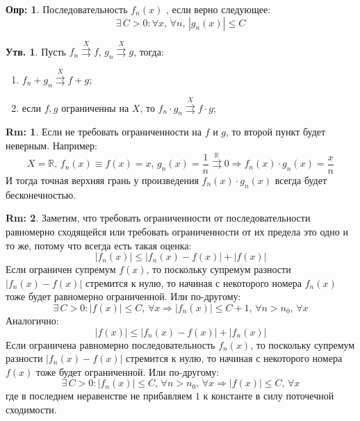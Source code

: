 \documentclass[12pt]{article}
\newcommand{\MR}{\mathbb{R}}
\theoremstyle{definition}
\newtheorem{defn}{Опр:}
\newtheorem{rem}{Rm:}
\newtheorem{prop}{Утв.}
\newcommand{\uconv}[1]{\overset{#1}{\rightrightarrows}}
\begin{document}
\begin{defn}
	Последовательность $f_n(x)$ , если верно следующее:
	$$
		\exists \, C > 0 \colon \forall x, \, \forall n,\, |g_n(x)| \leq C 
	$$
\end{defn}
\begin{prop}
	Пусть $f_n \uconv{X} f$, $g_n \uconv{X} g$, тогда: 
	\begin{enumerate}[label ={(\arabic*)}]
		\item $f_n + g_n \uconv{X} f + g$;
		\item если $f,g$ ограниченны на $X$, то $f_n {\cdot} g_n \uconv{X} f{\cdot}g$;
	\end{enumerate}
\end{prop}
\begin{rem}
	Если не требовать ограниченности на $f$ и $g$, то второй пункт будет неверным. Например:
	$$
		X = \MR, \, f_n(x) \equiv f(x) = x, \, g_n(x) = \dfrac{1}{n} \uconv{\MR}0 \Rightarrow f_n(x){\cdot}g_n(x) = \dfrac{x}{n}
	$$
	И тогда точная верхняя грань у произведения $f_n(x){\cdot}g_n(x)$ всегда будет бесконечностью.
\end{rem}
\begin{rem}
	Заметим, что требовать ограниченности от последовательности равномерно сходящейся или требовать ограниченности от их предела это одно и то же, потому что всегда есть такая оценка:
	$$
		|f_n(x)| \leq |f_n(x) - f(x)| + |f(x)|
	$$
	Если ограничен супремум $f(x)$, то поскольку супремум разности $|f_n(x) - f(x)|$ стремится к нулю, то начиная с некоторого номера $f_n(x)$ тоже будет равномерно ограниченной. Или по-другому:  
	$$
		\exists \, C > 0 \colon |f(x)| \leq C, \, \forall x \Rightarrow |f_n(x)| \leq C + 1	, \, \forall n > n_0, \, \forall x
	$$
	Аналогично:
	$$	
		|f(x)| \leq |f_n(x) - f(x)| + |f_n(x)|
	$$
	Если ограничена равномерно последовательность $f_n(x)$, то поскольку супремум разности $|f_n(x) - f(x)|$ стремится к нулю, то начиная с некоторого номера $f(x)$ тоже будет ограниченной. Или по-другому:
	$$
		\exists \, C > 0 \colon |f_n(x)| \leq C, \, \forall n > n_0, \, \forall x \Rightarrow |f(x)| \leq C, \, \forall x
	$$
	где в последнем неравенстве не прибавляем $1$ к константе в силу поточечной сходимости.
\end{rem}
\end{document}
